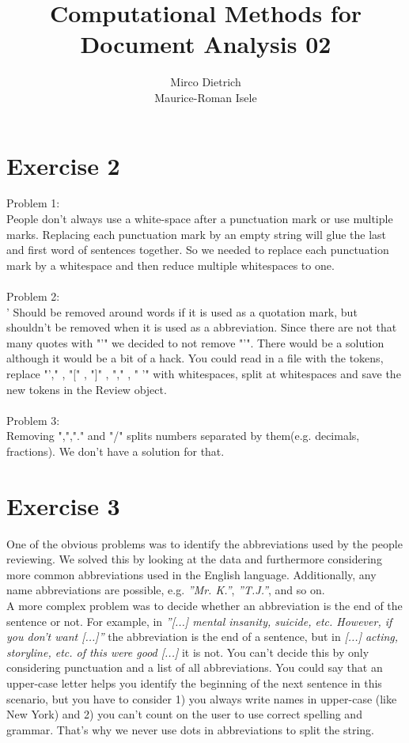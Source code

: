 \documentclass{article}
\title{Computational Methods for Document Analysis 02}
\author{Mirco Dietrich\\ Maurice-Roman Isele}
\begin{document}
\maketitle
\section*{Exercise 2}
Problem 1:\\
People don't always use a white-space after a punctuation mark or use multiple marks. Replacing each punctuation mark by an empty string will glue the last and first word of sentences together.
So we needed to replace each punctuation mark by a whitespace and then reduce multiple whitespaces to one.\\
\\
Problem 2:\\
' Should be removed around words if it is used as a quotation mark, but shouldn't be removed when it is used as a abbreviation.
Since there are not that many quotes with "'" we decided to not remove "'".
There would be a solution although it would be a bit of a hack.
You could read in a file with the tokens, replace "'," , "[" , "]" , "," , " '" with whitespaces, split at whitespaces and save the new tokens in the Review object.\\
\\
Problem 3:\\
Removing ",","." and "/" splits numbers separated by them(e.g. decimals, fractions). We don't have a solution for that.


\section*{Exercise 3}

One of the obvious problems was to identify the abbreviations used by the people reviewing. We solved this by looking at the data and furthermore considering more common abbreviations used in the English language. Additionally, any name abbreviations are possible, e.g. \textit{''Mr. K.''}, \textit{''T.J.''}, and so on. \\

A more complex problem was to decide whether an abbreviation is the end of the sentence or not. For example, in \textit{''[...] mental insanity, suicide, etc. However, if you don't want [...]''} the abbreviation is the end of a sentence, but in \textit{[...] acting, storyline, etc. of this were good [...]} it is not. You can't decide this by only considering punctuation and a list of all abbreviations. You could say that an upper-case letter helps you identify the beginning of the next sentence in this scenario, but you have to consider 1) you always write names in upper-case (like New York) and 2) you can't count on the user to use correct spelling and grammar. That's why we never use dots in abbreviations to split the string. \\
\end{document}
